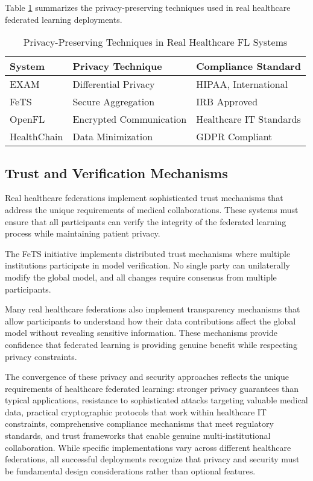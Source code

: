 \documentclass[3p,times,procedia]{elsarticle}
\begin{document}
Table \ref{tab:real_privacy_techniques} summarizes the privacy-preserving techniques used in real healthcare federated learning deployments.

\begin{table}[htbp]
\centering
\caption{Privacy-Preserving Techniques in Real Healthcare FL Systems}
\label{tab:real_privacy_techniques}
\begin{tabular}{|l|l|l|}
\hline
\textbf{System} & \textbf{Privacy Technique} & \textbf{Compliance Standard} \\
\hline
EXAM & Differential Privacy & HIPAA, International \\
\hline
FeTS & Secure Aggregation & IRB Approved \\
\hline
OpenFL & Encrypted Communication & Healthcare IT Standards \\
\hline
HealthChain & Data Minimization & GDPR Compliant \\
\hline
\end{tabular}
\end{table}

\subsection{Trust and Verification Mechanisms}

Real healthcare federations implement sophisticated trust mechanisms that address the unique requirements of medical collaborations. These systems must ensure that all participants can verify the integrity of the federated learning process while maintaining patient privacy.

The FeTS initiative implements distributed trust mechanisms where multiple institutions participate in model verification. No single party can unilaterally modify the global model, and all changes require consensus from multiple participants.

Many real healthcare federations also implement transparency mechanisms that allow participants to understand how their data contributions affect the global model without revealing sensitive information. These mechanisms provide confidence that federated learning is providing genuine benefit while respecting privacy constraints.

The convergence of these privacy and security approaches reflects the unique requirements of healthcare federated learning: stronger privacy guarantees than typical applications, resistance to sophisticated attacks targeting valuable medical data, practical cryptographic protocols that work within healthcare IT constraints, comprehensive compliance mechanisms that meet regulatory standards, and trust frameworks that enable genuine multi-institutional collaboration. While specific implementations vary across different healthcare federations, all successful deployments recognize that privacy and security must be fundamental design considerations rather than optional features.
\end{document}
